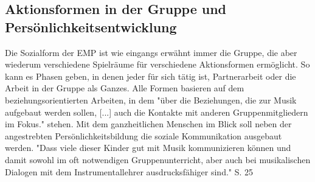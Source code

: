 \subsection{Aktionsformen in der Gruppe und Persönlichkeitsentwicklung}
Die Sozialform der EMP ist wie eingangs erwähnt immer die Gruppe, die aber
wiederum verschiedene Spielräume für verschiedene Aktionsformen ermöglicht. So
kann es Phasen geben, in denen jeder für sich tätig ist, Partnerarbeit oder die
Arbeit in der Gruppe als Ganzes. Alle Formen basieren auf dem
beziehungsorientierten Arbeiten, in dem "über die Beziehungen, die zur Musik
aufgebaut werden sollen, [...] auch die Kontakte mit anderen Gruppenmitgliedern
im Fokus." \autocite[10]{dartsch:kern_des_musizierens} stehen. Mit dem
ganzheitlichen Menschen im Blick soll neben der angestrebten
Persönlichkeitsbildung die soziale Kommunikation ausgebaut werden. "Dass viele
dieser Kinder gut mit Musik kommunizieren können und damit sowohl im oft
notwendigen Gruppenunterricht, aber auch bei musikalischen Dialogen mit dem
Instrumentallehrer ausdrucksfähiger sind." S. 25%












